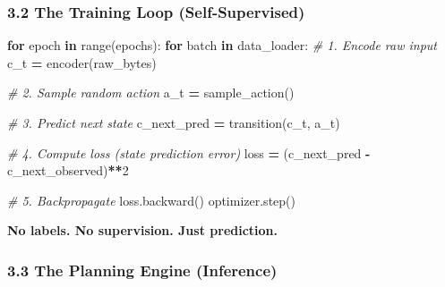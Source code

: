 \documentclass[
  11pt,
  a4paper,
]{article}
\newenvironment{Shaded}{\begin{snugshade}}{\end{snugshade}}
\newcommand{\BuiltInTok}[1]{#1}
\newcommand{\CommentTok}[1]{\textcolor[rgb]{0.56,0.35,0.01}{\textit{#1}}}
\newcommand{\ControlFlowTok}[1]{\textcolor[rgb]{0.13,0.29,0.53}{\textbf{#1}}}
\newcommand{\DecValTok}[1]{\textcolor[rgb]{0.00,0.00,0.81}{#1}}
\newcommand{\KeywordTok}[1]{\textcolor[rgb]{0.13,0.29,0.53}{\textbf{#1}}}
\newcommand{\NormalTok}[1]{#1}
\newcommand{\OperatorTok}[1]{\textcolor[rgb]{0.81,0.36,0.00}{\textbf{#1}}}
\begin{document}
\subsubsection{3.2 The Training Loop
(Self-Supervised)}\label{the-training-loop-self-supervised}

\begin{Shaded}
\begin{Highlighting}[]
\ControlFlowTok{for}\NormalTok{ epoch }\KeywordTok{in} \BuiltInTok{range}\NormalTok{(epochs):}
    \ControlFlowTok{for}\NormalTok{ batch }\KeywordTok{in}\NormalTok{ data\_loader:}
        \CommentTok{\# 1. Encode raw input}
\NormalTok{        c\_t }\OperatorTok{=}\NormalTok{ encoder(raw\_bytes)}
        
        \CommentTok{\# 2. Sample random action}
\NormalTok{        a\_t }\OperatorTok{=}\NormalTok{ sample\_action()}
        
        \CommentTok{\# 3. Predict next state}
\NormalTok{        c\_next\_pred }\OperatorTok{=}\NormalTok{ transition(c\_t, a\_t)}
        
        \CommentTok{\# 4. Compute loss (state prediction error)}
\NormalTok{        loss }\OperatorTok{=}\NormalTok{ (c\_next\_pred }\OperatorTok{{-}}\NormalTok{ c\_next\_observed)}\OperatorTok{**}\DecValTok{2}
        
        \CommentTok{\# 5. Backpropagate}
\NormalTok{        loss.backward()}
\NormalTok{        optimizer.step()}
\end{Highlighting}
\end{Shaded}

\textbf{No labels. No supervision. Just prediction.}

\subsubsection{3.3 The Planning Engine
(Inference)}\label{the-planning-engine-inference}
\end{document}
